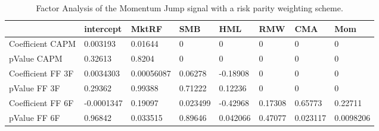 \begin{table}[H]
\centering
\begin{tabular}{llllllll}
& intercept & MktRF & SMB & HML & RMW & CMA & Mom \\ 
\hline 
Coefficient CAPM & 0.003193 & 0.01644 & 0 & 0 & 0 & 0 & 0 \\ 
pValue CAPM & 0.32613 & 0.8204 & 0 & 0 & 0 & 0 & 0 \\ 
Coefficient FF 3F & 0.0034303 & 0.00056087 & 0.06278 & -0.18908 & 0 & 0 & 0 \\ 
pValue FF 3F & 0.29362 & 0.99388 & 0.71222 & 0.12236 & 0 & 0 & 0 \\ 
Coefficient FF 6F & -0.0001347 & 0.19097 & 0.023499 & -0.42968 & 0.17308 & 0.65773 & 0.22711 \\ 
pValue FF 6F & 0.96842 & 0.033515 & 0.89646 & 0.042066 & 0.47077 & 0.023117 & 0.0098206 \\ 
\hline
\end{tabular}
\caption{Factor Analysis of the Momentum Jump signal with a risk parity weighting scheme.}
\label{MOMJUMPRP_FACTOR}
\end{table}